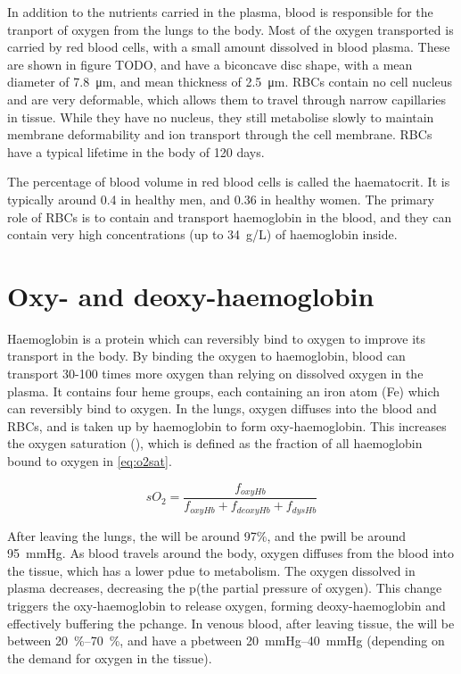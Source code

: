 In addition to the nutrients carried in the plasma,  blood is responsible for the tranport of oxygen from the lungs to the body.
Most of the oxygen transported is carried by red blood cells, with a small amount dissolved in blood plasma.
These are shown in figure TODO, and have a biconcave disc shape, with a mean diameter of \SI{7.8}{\micro\metre}, and mean thickness of \SI{2.5}{\micro\metre}.
RBCs contain no cell nucleus and are very deformable, which allows them to travel through narrow capillaries in tissue.
While they have no nucleus, they still metabolise slowly to maintain membrane deformability and ion transport through the cell membrane.
RBCs have a typical lifetime in the body of 120 days.

The percentage of blood volume in red blood cells is called the haematocrit.
It is typically around 0.4 in healthy men, and 0.36 in healthy women.
The primary role of RBCs is to contain and transport haemoglobin in the blood, and they can contain very high concentrations (up to \SI{34}{g/L}) of haemoglobin inside.

\section{Oxy- and deoxy-haemoglobin}
Haemoglobin is a protein which can reversibly bind to oxygen to improve  its transport in the body. \cite{HallGuytonHallTextbook2015}
By binding the oxygen to haemoglobin, blood can transport 30-100 times more oxygen than relying on dissolved oxygen in the plasma.
It contains four heme groups, each containing an iron atom (Fe) which can reversibly bind to oxygen.
In the lungs, oxygen diffuses into the blood and RBCs, and is taken up by haemoglobin to form oxy-haemoglobin.
This increases the oxygen saturation (\SOtwo), which is defined as the fraction of all haemoglobin bound to oxygen in \autoref{eq:o2sat}.

\begin{equation}
sO_2 = \frac{f_{oxyHb}}{f_{oxyHb} + f_{deoxyHb} + f_{dysHb}}
\label{eq:o2sat}
\end{equation}

After leaving the lungs, the \SOtwo will be around 97\%, and the p\Otwo will be around \SI{95}{mmHg}.
As blood travels around the body, oxygen diffuses from the blood into the tissue, which has a lower p\Otwo due to metabolism.
The oxygen dissolved in plasma decreases, decreasing the p\Otwo (the partial pressure of oxygen).
This change triggers the oxy-haemoglobin to release oxygen, forming deoxy-haemoglobin and effectively buffering the p\Otwo change.
In venous blood, after leaving tissue, the \SOtwo will be between \SIrange{20}{70}{\percent}, and have a p\Otwo between \SIrange{20}{40}{mmHg} (depending on the demand for oxygen in the tissue).

